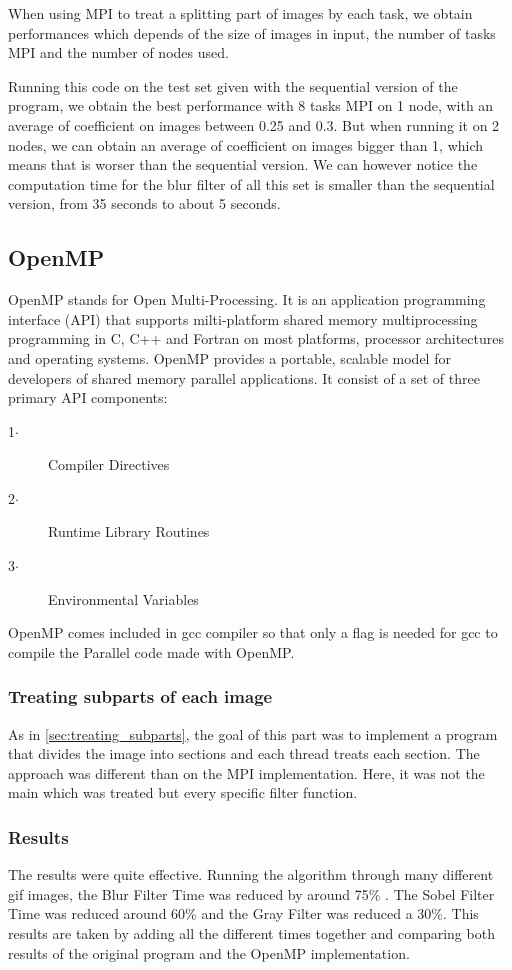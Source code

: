 \documentclass[conference,compsoc]{IEEEtran}
\begin{document}
When using MPI to treat a splitting part of images by each task, we obtain performances which depends of the size of images in input, the number of tasks MPI and the number of nodes used.

Running this code on the test set given with the sequential version of the program, we obtain the best performance with 8 tasks MPI on 1 node, with an average of coefficient on images between 0.25 and 0.3. But when running it on 2 nodes, we can obtain an average of coefficient on images bigger than 1, which means that is worser than the sequential version.
We can however notice the computation time for the blur filter of all this set is smaller than the sequential version, from 35 seconds to about 5 seconds.

\subsection{OpenMP} \label{sec:OpenMP}
OpenMP stands for Open Multi-Processing. It is an application programming interface (API) that supports milti-platform shared memory multiprocessing programming in C, C++ and Fortran on most platforms, processor architectures and operating systems.
OpenMP provides a portable, scalable model for developers of shared memory parallel applications.
It consist of a set of three primary API components:
\begin{description}
	\item[1$\cdot$] Compiler Directives
	\item[2$\cdot$] Runtime Library Routines
	\item[3$\cdot$] Environmental Variables
\end{description}

OpenMP comes included in gcc compiler so that only a flag is needed for gcc to compile the Parallel code made with OpenMP.

\subsubsection{Treating subparts of each image}
As in \ref{sec:treating_subparts}, the goal of this part was to implement a program that divides the image into sections and each thread treats each section. The approach was different than on the MPI implementation. Here, it was not the main which was treated but every specific filter function.

\subsubsection{Results} \label{sec:results}
The results were quite effective. Running the algorithm through many different gif images, the Blur Filter Time was reduced by around 75\% . The Sobel Filter Time was reduced around 60\% and the Gray Filter was reduced a 30\%. This results are taken by adding all the different times together and comparing both results of the original program and the OpenMP implementation.
\end{document}
